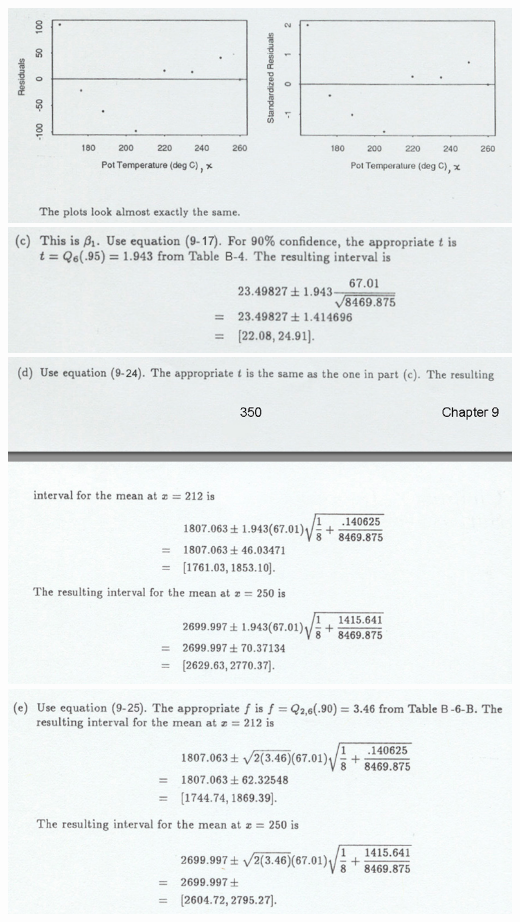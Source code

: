 \documentclass{article}\usepackage{graphicx, color}
\numberwithin{equation}{section}
\begin{document}
\begin{flushleft}
\begin{enumerate}[1. ]
 \includegraphics{../../fig/h11p1sol2.png}
 \includegraphics{../../fig/h11p1sol3.png}
 \includegraphics{../../fig/h11p1sol4.png}
 \includegraphics{../../fig/h11p1sol5.png}


\end{enumerate}
\end{flushleft}
\end{document}
